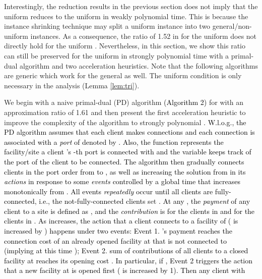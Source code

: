 \documentclass[10pt]{llncs}
\begin{document}
Interestingly, the reduction results in the previous section does
not imply that the uniform  reduces to the uniform 
in weakly polynomial time. This is because the instance shrinking
technique may split a uniform instance into two general/non-uniform
instances. As a consequence, the ratio of 1.52 in \cite{Swamy08FTFL2.076}
for the uniform  does not directly hold for the uniform .
Nevertheless, in this section, we show this ratio can still be preserved
for the uniform  in strongly polynomial time with a primal-dual
algorithm and two acceleration heuristics. Note that the following
algorithms are generic which work for the general  as well.
The uniform condition is only necessary in the analysis (Lemma \ref{lem:tri}). 

We begin with a naive primal-dual (PD) algorithm \textcolor{black}{(Algorithm
2)} for  with an approximation ratio of 1.61 and then present
the first acceleration heuristic to improve the complexity of the
algorithm to strongly polynomial \textcolor{black}{.
W.l.o.g., the PD algorithm assumes that each client  makes 
connections and each connection is associated with a }\textit{\textcolor{black}{port}}\textcolor{black}{{}
of  denoted by }\textcolor{black}{{} .
Also, the function  represents
the facility/site a client 's -th port is connected with and
the variable  keeps track of the port of the client  to
be connected. The algorithm then gradually connects clients in the
port order from  to , as well as increasing the solution
 from 
in its }\textit{\textcolor{black}{actions}}\textcolor{black}{{} in response
to some }\textit{\textcolor{black}{events }}\textcolor{black}{controlled
by a global time  that increases monotonically from . All
events }\textit{\textcolor{black}{repeatedly}}\textcolor{black}{{} occur
until all clients are fully-connected, i.e., the not-fully-connected
clients s}et \textcolor{black}{. At any ,
the }\textit{\textcolor{black}{payment}}\textcolor{black}{{} of any
client  to a site  is defined as , and the }\textit{\textcolor{black}{contribution}}\textcolor{black}{{}
is  for the clients in 
and 
for the clients in . As  increases,
the action that a client  connects to a facility of  (
is increased by ) happens under two events: Event 1. 's payment
reaches the connection cost  of an already opened facility
at  that  is not connected to (implying at this time );
Event 2. sum of contributions of all clients to a closed facility
at  reaches its opening cost . In particular, if ,
Event 2 triggers the action that a new facility at  is opened
first ( is increased by 1). Then any client 
with }
\end{document}
